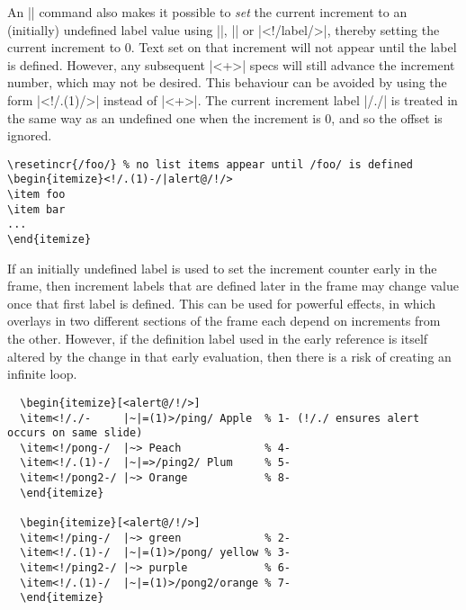 \documentclass[a4paper]{ltxdoc}
\begin{document}
An |\allowundefinedincrlabels| command also makes it possible to \emph{set} the
current increment to an (initially) undefined label value using |\resetincr|,
|\fromincr| or |<!/label/>|, thereby setting the current increment to 0.  Text
set on that increment will not appear until the label is defined.  However, any
subsequent |<+>| specs will still advance the increment number, which may not be
desired.  This behaviour can be avoided by using the form |<!/.(1)/>| instead of
|<+>|.  The current increment label |/./| is treated in the same way as an
undefined one when the increment is 0, and so the offset is ignored.
\example
\begin{verbatim}
\resetincr{/foo/} % no list items appear until /foo/ is defined
\begin{itemize}<!/.(1)-/|alert@/!/>
\item foo
\item bar
...
\end{itemize}
\end{verbatim}
If an initially undefined label is used to set the increment counter early in
the frame, then increment labels that are defined later in the frame may change
value once that first label is defined.  This can be used for powerful effects,
in which overlays in two different sections of the frame each depend on
increments from the other.  However, if the definition label used in the early
reference is itself altered by the change in that early evaluation, then there
is a risk of creating an infinite loop.
\example
\begin{verbatim}
  \begin{itemize}[<alert@/!/>]
  \item<!/./-     |~|=(1)>/ping/ Apple  % 1- (!/./ ensures alert occurs on same slide)
  \item<!/pong-/  |~> Peach             % 4-
  \item<!/.(1)-/  |~|=>/ping2/ Plum     % 5-
  \item<!/pong2-/ |~> Orange            % 8-
  \end{itemize}
  
  \begin{itemize}[<alert@/!/>]
  \item<!/ping-/  |~> green             % 2-
  \item<!/.(1)-/  |~|=(1)>/pong/ yellow % 3-
  \item<!/ping2-/ |~> purple            % 6-
  \item<!/.(1)-/  |~|=(1)>/pong2/orange % 7-
  \end{itemize}
\end{verbatim}
\end{document}
